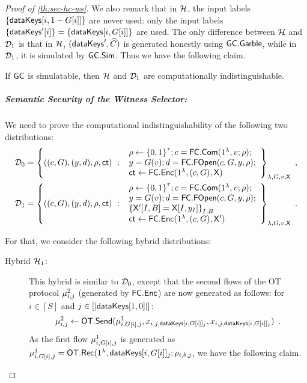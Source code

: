 \begin{proof}[Proof of \cref{th:sec-hc-ws}]
  We also remark that in $\mathcal{H}$, the input labels ${\{\mathsf{dataKeys}[i,1-G[i]]\}}$ are never used: only the input labels ${\{\mathsf{dataKeys}'[i]\}} = {\{\mathsf{dataKeys}[i,G[i]]\}}$ are used. The only difference between $\mathcal{H}$ and $\mathcal{D}_1$ is that in $\mathcal{H}$, $(\mathsf{dataKeys}',\widehat{C})$ is generated honestly using $\mathsf{GC.Garble}$, while in $\mathcal{D}_1$, it is simulated by $\mathsf{GC.Sim}$.
  Thus we have the following claim.

  \begin{claim}
    If $\mathsf{GC}$ is simulatable, then $\mathcal{H}$ and $\mathcal{D}_1$ are computationally indistinguishable.
  \end{claim}

  \subparagraph{Semantic Security of the Witness Selector:}  We need to prove the computational indistinguishability of the following two distributions:
  \begin{align*}
    \mathcal{D}_0 &= {\left\{
    ((c,G), (y,d), \rho, \mathsf{ct})
    \ : \
               \begin{array}{l}
                 \rho \gets {\{0,1\}}^\tau;
                 c = \mathsf{FC.Com}(1^\lambda,v;\rho); \\
                 y = G(v); d = \mathsf{FC.FOpen}(c,G,y,\rho); \\
                 \mathsf{ct} \gets \mathsf{\mathsf{FC}.Enc}(1^\lambda,(c,G),\mathsf{X})
               \end{array}
    \right\}}_{\lambda,G,v,\mathsf{X}} \enspace, \\
    \mathcal{D}_1 &= {\left\{
    ((c,G), (y,d), \rho, \mathsf{ct})
    \ : \
               \begin{array}{l}
                 \rho \gets {\{0,1\}}^\tau; 
                 c = \mathsf{FC.Com}(1^\lambda,v;\rho); \\
                 y = G(v); d = \mathsf{FC.FOpen}(c,G,y,\rho); \\
                 {\{\mathsf{X}'[I,B] = \mathsf{X}[I, y_I]\}}_{I,B} \\
                 \mathsf{ct} \gets \mathsf{\mathsf{FC}.Enc}(1^\lambda,(c,G),\mathsf{X}')
               \end{array}
    \right\}}_{\lambda,G,v,\mathsf{X}} \enspace. \\
  \end{align*}

  For that, we consider the following hybrid distributions:
  \begin{description}
  \item[Hybrid $\mathcal{H}_1$:] This hybrid is similar to $\mathcal{D}_0$, except that the second flows of the OT protocol $\mu^2_{i,j}$ (generated by $\mathsf{\mathsf{FC}.Enc}$) are now generated as follows: for $i \in [S]$ and $j \in [|\mathsf{dataKeys}[1,0]|]$:
    \[ \mu^2_{i,j} \gets \mathsf{OT.Send}(\mu^1_{i,G[i],j},x_{i,j,\mathsf{dataKeys}[i,G[i]]_j},x_{i,j,\mathsf{dataKeys}[i,G[i]]_j}) \enspace. \]
    As the first flow $\mu^1_{i,G[i],j}$ is generated as $\mu^1_{i,G[i],j} = \mathsf{OT.Rec}(1^\lambda,\mathsf{dataKeys}[i,G[i]]_j; \rho_{i,b,j}$, we have the following claim.


\end{description}
\end{proof}
